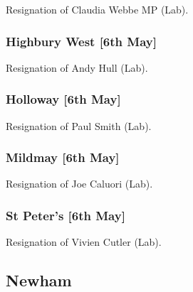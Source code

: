 \documentclass[a4paper,openany]{book}
\begin{document}
\begin{resultsiii}

Resignation of Claudia Webbe MP (Lab).

\subsubsection*{Highbury West \hspace*{\fill}\nolinebreak[1]%
	\enspace\hspace*{\fill}
	[6th May]}


Resignation of Andy Hull (Lab).

\subsubsection*{Holloway \hspace*{\fill}\nolinebreak[1]%
	\enspace\hspace*{\fill}
	[6th May]}


Resignation of Paul Smith (Lab).

\subsubsection*{Mildmay \hspace*{\fill}\nolinebreak[1]%
	\enspace\hspace*{\fill}
	[6th May]}


Resignation of Joe Caluori (Lab).

\subsubsection*{St Peter's \hspace*{\fill}\nolinebreak[1]%
	\enspace\hspace*{\fill}
	[6th May]}


Resignation of Vivien Cutler (Lab).

\subsection*{Newham}


\end{resultsiii}
\end{document}
